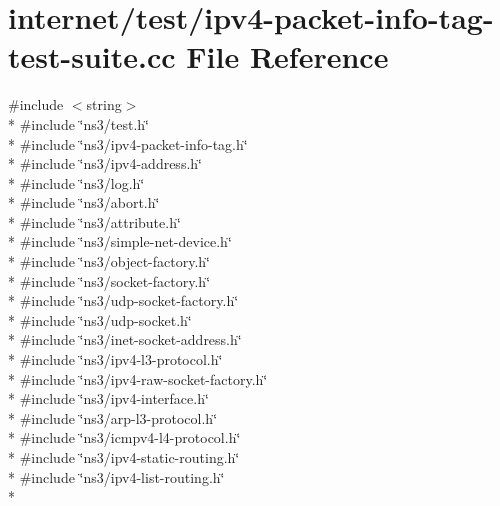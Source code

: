 \hypertarget{ipv4-packet-info-tag-test-suite_8cc}{}\section{internet/test/ipv4-\/packet-\/info-\/tag-\/test-\/suite.cc File Reference}
\label{ipv4-packet-info-tag-test-suite_8cc}
{\ttfamily \#include $<$string$>$}\\*
{\ttfamily \#include \char`\"{}ns3/test.\+h\char`\"{}}\\*
{\ttfamily \#include \char`\"{}ns3/ipv4-\/packet-\/info-\/tag.\+h\char`\"{}}\\*
{\ttfamily \#include \char`\"{}ns3/ipv4-\/address.\+h\char`\"{}}\\*
{\ttfamily \#include \char`\"{}ns3/log.\+h\char`\"{}}\\*
{\ttfamily \#include \char`\"{}ns3/abort.\+h\char`\"{}}\\*
{\ttfamily \#include \char`\"{}ns3/attribute.\+h\char`\"{}}\\*
{\ttfamily \#include \char`\"{}ns3/simple-\/net-\/device.\+h\char`\"{}}\\*
{\ttfamily \#include \char`\"{}ns3/object-\/factory.\+h\char`\"{}}\\*
{\ttfamily \#include \char`\"{}ns3/socket-\/factory.\+h\char`\"{}}\\*
{\ttfamily \#include \char`\"{}ns3/udp-\/socket-\/factory.\+h\char`\"{}}\\*
{\ttfamily \#include \char`\"{}ns3/udp-\/socket.\+h\char`\"{}}\\*
{\ttfamily \#include \char`\"{}ns3/inet-\/socket-\/address.\+h\char`\"{}}\\*
{\ttfamily \#include \char`\"{}ns3/ipv4-\/l3-\/protocol.\+h\char`\"{}}\\*
{\ttfamily \#include \char`\"{}ns3/ipv4-\/raw-\/socket-\/factory.\+h\char`\"{}}\\*
{\ttfamily \#include \char`\"{}ns3/ipv4-\/interface.\+h\char`\"{}}\\*
{\ttfamily \#include \char`\"{}ns3/arp-\/l3-\/protocol.\+h\char`\"{}}\\*
{\ttfamily \#include \char`\"{}ns3/icmpv4-\/l4-\/protocol.\+h\char`\"{}}\\*
{\ttfamily \#include \char`\"{}ns3/ipv4-\/static-\/routing.\+h\char`\"{}}\\*
{\ttfamily \#include \char`\"{}ns3/ipv4-\/list-\/routing.\+h\char`\"{}}\\*

